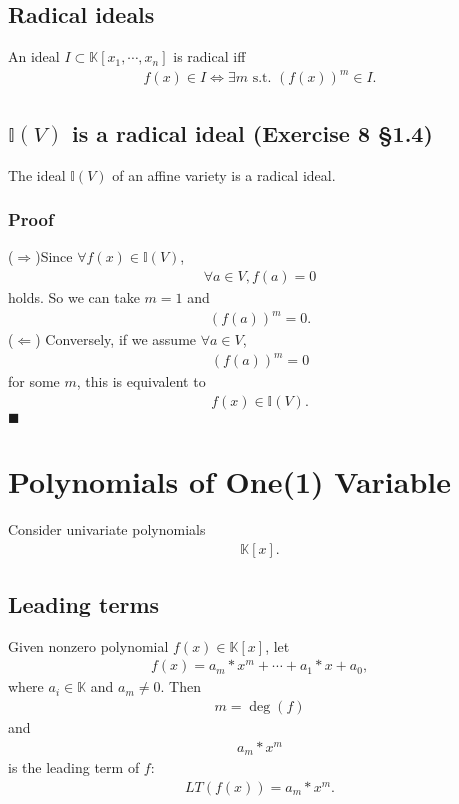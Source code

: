 \documentclass[11pt]{book}
\begin{document}
\subsection{Radical ideals}%
An ideal $I \subset \mathbb{K}[x_1,\cdots,x_n]$ is radical iff
\begin{eqnarray}
f(x) \in I \Leftrightarrow \exists m \text{ s.t. } \left( f(x) \right)^m \in I.
\end{eqnarray}

\subsection{$\mathbb{I}(V)$ is a radical ideal (Exercise 8 \S 1.4)}
The ideal $\mathbb{I}(V)$ of an affine variety is a radical ideal.

\subsubsection{Proof}
($\Rightarrow$)Since $\forall f(x) \in \mathbb{I}(V)$,
\begin{eqnarray}
\forall a \in V, f(a) = 0
\end{eqnarray}
holds.
So we can take $m=1$ and
\begin{eqnarray}
\left( f(a)  \right)^m  = 0.
\end{eqnarray}
($\Leftarrow$)
Conversely, if we assume $\forall a \in V$,
\begin{eqnarray}
\left( f(a)  \right)^m = 0
\end{eqnarray}
for some $m$, this is equivalent to
\begin{eqnarray}
f(x) \in \mathbb{I}(V).
\end{eqnarray}
$\blacksquare$


\section{Polynomials of One(1) Variable}
Consider univariate polynomials
\begin{eqnarray}
\mathbb{K}[x].
\end{eqnarray}

\subsection{Leading terms}
Given nonzero polynomial $f(x) \in \mathbb{K}[x]$, let
\begin{eqnarray}
f(x) = a_m * x^m + \cdots + a_1 * x + a_0,
\end{eqnarray}
where $a_i \in \mathbb{K}$ and $a_m \neq 0$.
Then
\begin{eqnarray}
m = \deg(f)
\end{eqnarray}
and
\begin{eqnarray}
a_m * x^m
\end{eqnarray}
is the leading term of $f$:
\begin{eqnarray}
LT\left(f(x) \right) = a_m * x^m.
\end{eqnarray}
\end{document}
